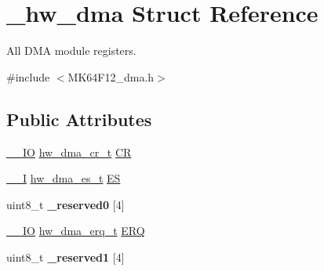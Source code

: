 \hypertarget{struct__hw__dma}{}\section{\+\_\+hw\+\_\+dma Struct Reference}
\label{struct__hw__dma}


All D\+MA module registers.  




{\ttfamily \#include $<$M\+K64\+F12\+\_\+dma.\+h$>$}

\subsection*{Public Attributes}
\begin{DoxyCompactItemize}
\item 
\hyperlink{core__sc300_8h_aec43007d9998a0a0e01faede4133d6be}{\+\_\+\+\_\+\+IO} \hyperlink{union__hw__dma__cr}{hw\+\_\+dma\+\_\+cr\+\_\+t} \hyperlink{struct__hw__dma_a7d54d15b6c25a23110484ef13a8f1ab9}{CR}
\item 
\hyperlink{core__sc300_8h_af63697ed9952cc71e1225efe205f6cd3}{\+\_\+\+\_\+I} \hyperlink{union__hw__dma__es}{hw\+\_\+dma\+\_\+es\+\_\+t} \hyperlink{struct__hw__dma_a92a8e5a0c21479b7e9890a61f2c96e84}{ES}
\item 
uint8\+\_\+t {\bfseries \+\_\+reserved0} \mbox{[}4\mbox{]}\hypertarget{struct__hw__dma_ab37c093418df22b13e4b70e4b13c4132}{}\label{struct__hw__dma_ab37c093418df22b13e4b70e4b13c4132}

\item 
\hyperlink{core__sc300_8h_aec43007d9998a0a0e01faede4133d6be}{\+\_\+\+\_\+\+IO} \hyperlink{union__hw__dma__erq}{hw\+\_\+dma\+\_\+erq\+\_\+t} \hyperlink{struct__hw__dma_ae78f17b88a9d5769d4404427fcf42c6d}{E\+RQ}
\item 
uint8\+\_\+t {\bfseries \+\_\+reserved1} \mbox{[}4\mbox{]}\hypertarget{struct__hw__dma_a757e312208cb6503d53459f85e0ceb18}{}\label{struct__hw__dma_a757e312208cb6503d53459f85e0ceb18}


\end{DoxyCompactItemize}
